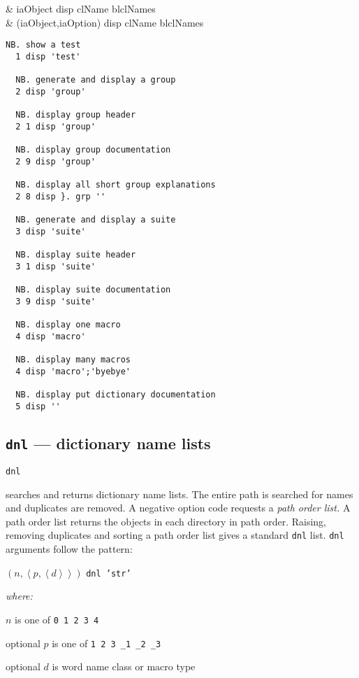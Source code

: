 \begin{wordhead}
\dyad & iaObject disp clName \argsep blclNames \\
      & (iaObject,iaOption) disp clName \argsep blclNames \\
\end{wordhead}
\begin{lstlisting}[frame=single,framerule=0pt]
  NB. show a test 
  1 disp 'test'  
  
  NB. generate and display a group 
  2 disp 'group' 

  NB. display group header 
  2 1 disp 'group' 
  
  NB. display group documentation 
  2 9 disp 'group' 
  
  NB. display all short group explanations
  2 8 disp }. grp ''    

  NB. generate and display a suite 
  3 disp 'suite' 

  NB. display suite header 
  3 1 disp 'suite'  
  
  NB. display suite documentation 
  3 9 disp 'suite'     

  NB. display one macro
  4 disp 'macro' 
  
  NB. display many macros           
  4 disp 'macro';'byebye' 
  
  NB. display put dictionary documentation
  5 disp ''      
\end{lstlisting}
  
\subsection{\texttt{dnl} --- dictionary name lists}\label{ss:dnl}

\hypertarget{il:dnl}{\texttt{dnl}} searches and returns dictionary name lists. 
The entire path is searched for names and duplicates are removed. 
A negative option code requests a \emph{path order list.} A path order list returns
 the objects in each directory in path order. 
 Raising, removing duplicates and sorting a path order list gives a 
 standard \texttt{dnl} list. \texttt{dnl} arguments follow the pattern: 

\begin{description}
\item $(n, \left\langle p, \left\langle d \right\rangle \right\rangle)$ \texttt{dnl 'str'}
\item \emph{ where:}
\begin{description}
\item $n$ is one of \verb|0 1 2 3 4 |
\item optional $p$ is one of \verb|1 2 3 _1 _2 _3 |
\item optional $d$ is word name class or macro type
\end{description}
\end{description}

